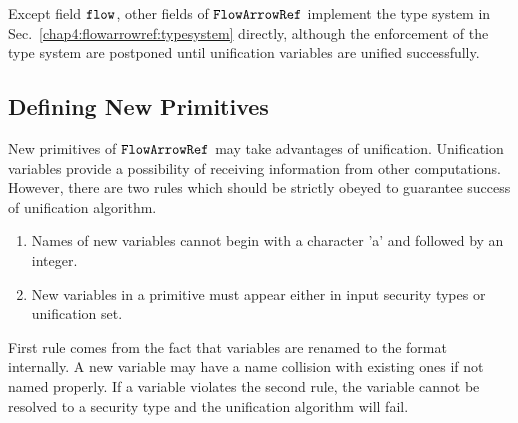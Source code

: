 \documentclass{report}
\newcommand{\co}[1]{$\cod{#1}$}
\begin{document}

Except field \co{flow}, other fields of \co{FlowArrowRef} implement the type system 
in Sec.~\ref{chap4:flowarrowref:typesystem} directly, although the enforcement of the type system are 
postponed until unification variables are unified successfully.

\subsection{Defining New Primitives}
New primitives of \co{FlowArrowRef} may take advantages of unification.
Unification variables provide a possibility of receiving information from 
other computations.
However, there are two rules which should be strictly obeyed to guarantee success of unification
algorithm.
\begin{enumerate}
\item Names of new variables cannot begin with a character 'a' and followed by an integer.
\item New variables in a primitive must appear either in input security types or unification set.
\end{enumerate}
First rule comes from the fact that variables are renamed to the format internally. A new variable may 
have a name collision with existing ones if not named properly. 
If a variable violates the second rule, the variable cannot be resolved to a security type and the
unification algorithm will fail.
\end{document}
